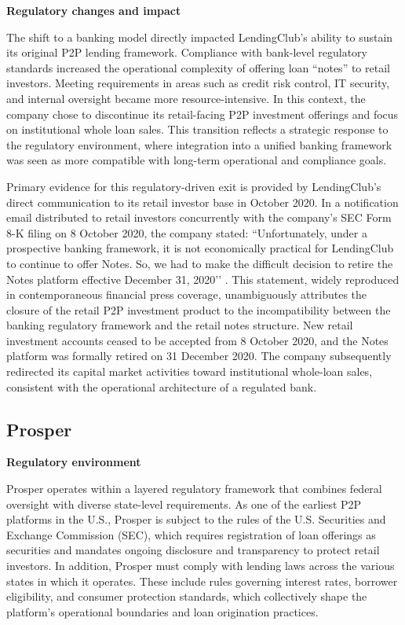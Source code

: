 \documentclass[pdflatex,sn-apa]{sn-jnl}%
\theoremstyle{thmstyleone}%
\theoremstyle{thmstyletwo}%
\theoremstyle{thmstylethree}%
\begin{document}
\textbf{Regulatory changes and impact}

The shift to a banking model directly impacted LendingClub’s ability to sustain its original P2P lending framework. Compliance with bank-level regulatory standards increased the operational complexity of offering loan “notes” to retail investors. Meeting requirements in areas such as credit risk control, IT security, and internal oversight became more resource-intensive. In this context, the company chose to discontinue its retail-facing P2P investment offerings and focus on institutional whole loan sales. This transition reflects a strategic response to the regulatory environment, where integration into a unified banking framework was seen as more compatible with long-term operational and compliance goals.

\textcolor{NavyBlue}{Primary evidence for this regulatory-driven exit is provided by LendingClub’s direct communication to its retail investor base in October 2020. In a notification email distributed to retail investors concurrently with the company’s SEC Form 8-K filing on 8 October 2020, the company stated: ``Unfortunately, under a prospective banking framework, it is not economically practical for LendingClub to continue to offer Notes. So, we had to make the difficult decision to retire the Notes platform effective December 31, 2020’’ \citep{renton_lendingclub_2020}. This statement, widely reproduced in contemporaneous financial press coverage, unambiguously attributes the closure of the retail P2P investment product to the incompatibility between the banking regulatory framework and the retail notes structure. New retail investment accounts ceased to be accepted from 8 October 2020, and the Notes platform was formally retired on 31 December 2020. The company subsequently redirected its capital market activities toward institutional whole-loan sales, consistent with the operational architecture of a regulated bank.}

\subsection{Prosper}

\textbf{Regulatory environment}

Prosper operates within a layered regulatory framework that combines federal oversight with diverse state-level requirements. As one of the earliest P2P platforms in the U.S., Prosper is subject to the rules of the U.S. Securities and Exchange Commission (SEC), which requires registration of loan offerings as securities and mandates ongoing disclosure and transparency to protect retail investors. In addition, Prosper must comply with lending laws across the various states in which it operates. These include rules governing interest rates, borrower eligibility, and consumer protection standards, which collectively shape the platform’s operational boundaries and loan origination practices.
\end{document}
